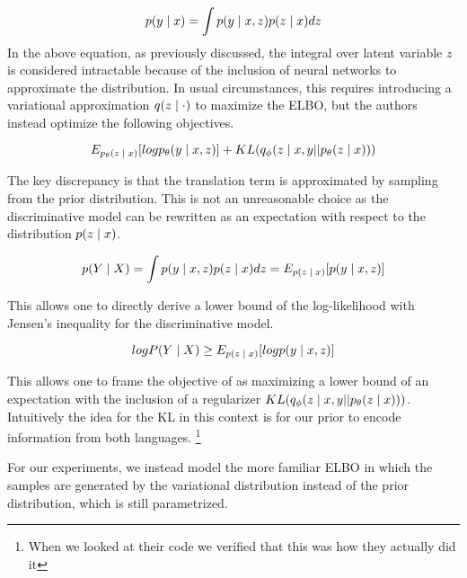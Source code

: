 \begin{equation}
p(y \; | \;{x})  = \int p(y \; | \;{x,z}) p(z \; | \;{x}) dz
\end{equation}
In the above equation, as previously discussed, the integral over latent variable $z$ is considered intractable because of the inclusion of neural networks to approximate the distribution. In usual circumstances, this requires introducing a variational approximation $q(z \; | \;{\cdot})$ to maximize the \ac{ELBO}, but the authors instead optimize the following objectives. %


\begin{equation}
E_{p_{\theta}(z \; | \;{x})}[log p_{\theta}(y \; | \;{x,z})] +  KL (q_{\phi}(z \; | \;{x, y} || p_{\theta}(z \; | \;{x})))
\end{equation}

The key discrepancy is that the translation term is approximated by sampling from the prior distribution. This is not an unreasonable choice as the discriminative model can be rewritten as an expectation with respect to the distribution $p(z \; | \;{x})$.

\begin{equation}
p(Y \; | \;{X})  = \int p(y \; | \;{x,z}) p(z \; | \;{x}) dz = E_{p(z \; | \;{x})}[p(y \; | \;{x,z})]
\end{equation}



This allows one to directly derive a lower bound of the log-likelihood with Jensen's inequality for the discriminative model. 

\begin{equation}
log P(Y \; | \;{X}) \geq E_{p(z \; | \;{x})}[log p(y \; | \;{x,z})]
\end{equation}

This allows one to frame the objective of \citet{Zhang2016VNMT} as maximizing a lower bound of an expectation with the inclusion of a regularizer $KL (q_{\phi}(z \; | \;{x, y} || p_{\theta}(z \; | \;{x})))$. Intuitively the idea for the KL in this context is for our prior to encode information from both languages.  \footnote{When we looked at their code we verified that this was how they actually did it} 

For our experiments, we instead model the more familiar ELBO in which the samples are generated by the variational distribution instead of the prior distribution, which is still parametrized. 

